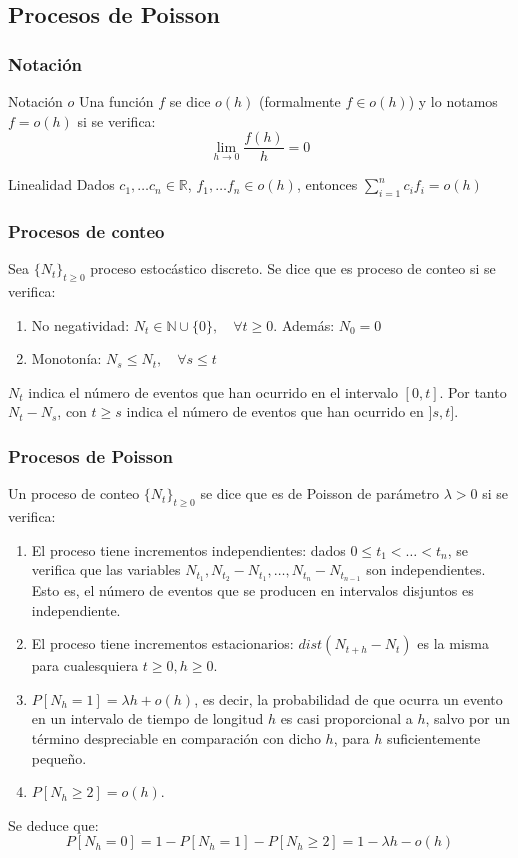 \documentclass[8pt]{beamer}
\begin{document}
  \subsection{Procesos de Poisson}
  \begin{frame}\frametitle{Notación}
    \begin{block}{Notación $o$}
    Una función $f$ se dice $o(h)$ (formalmente $f\in o(h)$) y lo notamos $f=o(h)$ si se verifica:
    \[\lim_{h\rightarrow 0} \frac{f(h)}{h} = 0\]
    \end{block}
    \begin{block}{Linealidad}
      Dados $c_1, \ldots c_n \in \mathbb{R}$, $f_1, \ldots f_n \in o(h)$, entonces $\sum_{i=1}^{n} c_i f_i = o(h)$
    \end{block}
  \end{frame}

  \begin{frame}\frametitle{Procesos de conteo}
    Sea $\{N_t\}_{t\ge 0}$ proceso estocástico discreto. Se dice que es proceso de conteo si se verifica:
    \begin{enumerate}
    \item No negatividad: $N_t \in \mathbb{N}\cup\{0\}, \quad \forall t\ge 0$. Además: $N_0=0$
    \item Monotonía: $N_s \le N_t, \quad \forall s \le t$
    \end{enumerate}

    $N_t$ indica el número de eventos que han ocurrido en el intervalo $[0,t]$. Por tanto $N_t- N_s$, con $t\ge s$
    indica el número de eventos que han ocurrido en $]s,t]$.
  \end{frame}

  \begin{frame}\frametitle{Procesos de Poisson}
    Un proceso de conteo $\{N_t\}_{t\ge 0}$ se dice que es de Poisson de parámetro $\lambda > 0$ si se verifica:

    \begin{enumerate}
    \item El proceso tiene incrementos independientes: dados $0 \le t_1 < \ldots < t_n$, se verifica que
      las variables $N_{t_1}, N_{t_2} - N_{t_1}, \ldots, N_{t_n}- N_{t_{n-1}}$ son independientes. Esto es, el número de eventos
      que se producen en intervalos disjuntos es independiente.
    \item El proceso tiene incrementos estacionarios: $dist(N_{t+h} - N_t)$ es la misma para cualesquiera
      $t\ge 0, h\ge 0$.
    \item $P[N_h = 1] = \lambda h + o(h)$, es decir, la probabilidad de que ocurra un evento en un intervalo de
      tiempo de longitud $h$ es casi proporcional a $h$, salvo por un término despreciable en comparación con dicho $h$, para
      $h$ suficientemente pequeño.
    \item $P[N_h \ge 2] = o(h)$.
    \end{enumerate}

    Se deduce que:
    \[P[N_h = 0] = 1 - P[N_h=1] - P[N_h \ge 2] = 1 -\lambda h - o(h)\]
  \end{frame}
\end{document}
